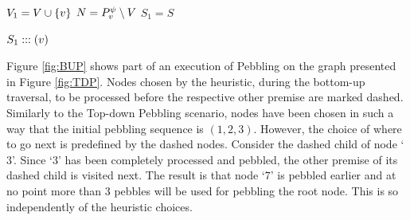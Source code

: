 \documentclass{llncs}
\newcommand{\nodedistance}{0.55cm}
\newcommand{\Premises}[2]{P_{#1}^{#2}}
\begin{document}
\begin{algorithm}[h]
	
	$V_1 = V \cup \{v\}$\;
	$N = \Premises{\n}{\psi} \setminus V$\;
	$S_1 = S$
	
	
	\Return $S_1 ::: (v)$\;
	
  \caption[.]{}
  \label{algo:visit}
\end{algorithm}

\begin{example}
Figure \ref{fig:BUP} shows part of an execution of  Pebbling on the graph presented in Figure \ref{fig:TDP}.
Nodes chosen by the heuristic, during the bottom-up traversal, to be processed before the respective other premise are marked dashed. Similarly to the Top-down Pebbling scenario, nodes have been chosen in such a way that the initial pebbling sequence is $(1,2,3)$.
However, the choice of where to go next is predefined by the dashed nodes. Consider the dashed child of node `$3$'. Since `$3$' has been completely processed and pebbled, the other premise of its dashed child is visited next. The result is that node `$7$' is pebbled earlier and at no point more than 3 pebbles will be used for pebbling the root node. This is so independently of the heuristic choices.


\end{example}
\end{document}
